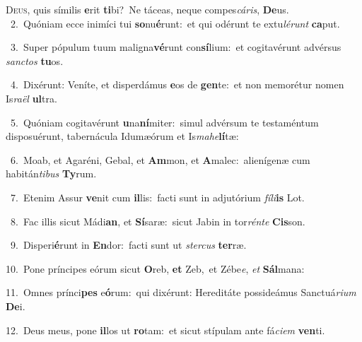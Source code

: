 \lettrine{\initial\textcolor{\initialcolor}{D}}{eus,} quis símilis \textbf{e}\-rit \textbf{ti}\-bi?~\star Ne táceas, neque compes\-\textit{cá}\-\textit{ris}, \textbf{De}\-us.\\
{\numbfont\textcolor{\numbcolor}{~2.}}~Quóniam ecce inimíci tui \textbf{so}\-nu\-\textbf{é}\-runt:~\star et qui odérunt te extu\-\textit{lé}\-\textit{runt} \textbf{ca}\-put.\par
{\numbfont\textcolor{\numbcolor}{~3.}}~Super pópulum tuum maligna\-\textbf{vé}\-runt con\-\textbf{sí}\-lium:~\star et cogitavérunt advérsus \textit{sanc}\-\textit{tos} \textbf{tu}\-os.\par
{\numbfont\textcolor{\numbcolor}{~4.}}~Dixérunt: Veníte, et disperdámus \textbf{e}\-os de \textbf{gen}\-te:~\star et non memorétur nomen Is\-\textit{ra}\-\textit{ël} \textbf{ul}\-tra.\par
{\numbfont\textcolor{\numbcolor}{~5.}}~Quóniam cogitavérunt \textbf{u}\-na\-\textbf{ní}\-miter:~\star simul advérsum te testaméntum disposuérunt, tabernácula Idumæórum et Is\-\textit{ma}\-\textit{he}\textbf{lí}tæ:\par
{\numbfont\textcolor{\numbcolor}{~6.}}~Moab, et Agaréni, Gebal, et \textbf{Am}\-mon, et \textbf{A}\-malec:~\star alienígenæ cum habitán\-\textit{ti}\-\textit{bus} \textbf{Ty}\-rum.\par
{\numbfont\textcolor{\numbcolor}{~7.}}~Etenim Assur \textbf{ve}\-nit cum \textbf{il}\-lis:~\star facti sunt in adjutórium \textit{fí}\-\textit{li}\textbf{is} Lot.\par
{\numbfont\textcolor{\numbcolor}{~8.}}~Fac illis sicut Mádi\-\textbf{an}\-, et \textbf{Sí}\-saræ:~\star sicut Jabin in tor\-\textit{rén}\-\textit{te} \textbf{Cis}\-son.\par
{\numbfont\textcolor{\numbcolor}{~9.}}~Disperi\-\textbf{é}\-runt in \textbf{En}\-dor:~\star facti sunt ut \textit{ster}\-\textit{cus} \textbf{ter}\-ræ.\par
{\numbfont\textcolor{\numbcolor}{10.}}~Pone príncipes eórum sicut \textbf{O}\-reb, \textbf{et} Zeb,~\star et Zébe\-\textit{e}\-, \textit{et} \textbf{Sál}\-mana:\par
{\numbfont\textcolor{\numbcolor}{11.}}~Omnes prínci\textbf{pes} e\-\textbf{ó}\-rum:~\star qui dixérunt: Hereditáte possideámus Sanctuá\-\textit{ri}\-\textit{um} \textbf{De}\-i.\par
{\numbfont\textcolor{\numbcolor}{12.}}~Deus meus, pone \textbf{il}\-los ut \textbf{ro}\-tam:~\star et sicut stípulam ante fá\-\textit{ci}\-\textit{em} \textbf{ven}\-ti.\par

